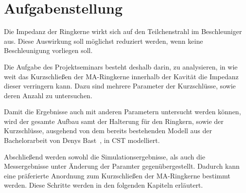\section{Aufgabenstellung}
Die Impedanz der Ringkerne wirkt sich auf den Teilchenstrahl im Beschleuniger aus. Diese Auswirkung soll möglichst reduziert werden, wenn keine Beschleunigung vorliegen soll.
\par
Die Aufgabe des Projektseminars besteht deshalb darin, zu analysieren, in wie weit das Kurzschlie\ss{}en der MA-Ringkerne innerhalb der Kavit\"at die Impedanz dieser verringern kann. Dazu sind mehrere Parameter der Kurzschl\"usse, sowie deren Anzahl zu untersuchen.
\par
Damit die Ergebnisse auch mit anderen Parametern untersucht werden k\"onnen, wird der gesamte Aufbau samt der Halterung f\"ur den Ringkern, sowie der Kurzschl\"usse, ausgehend von dem bereits bestehenden Modell aus der Bachelorarbeit von Denys Bast~\citep{bast2017ba}, in CST modelliert. 
\par
Abschlie\ss{}end werden sowohl die Simulationsergebnisse, als auch die Messergebnisse unter \"Anderung der Paramter gegen\"ubergestellt. Dadurch kann eine pr\"aferierte Anordnung zum Kurzschlie\ss{}en der MA-Ringkerne bestimmt werden. Diese Schritte werden in den folgenden Kapiteln erl\"autert. 